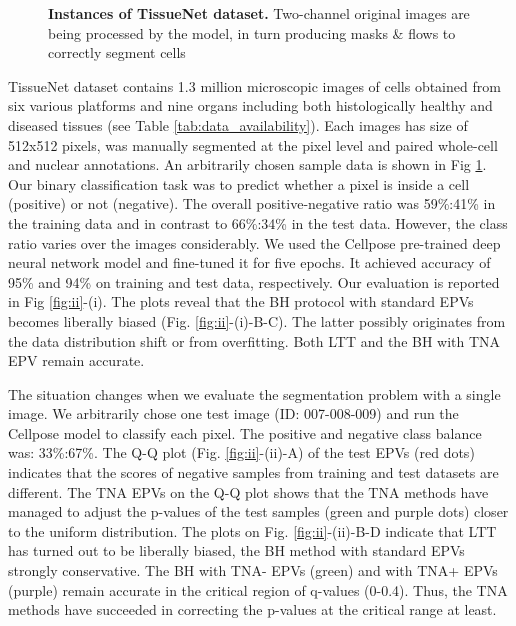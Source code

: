 \documentclass[10pt,letterpaper]{article}
\begin{document}
\begin{figure}[h!]
    \centering
	\caption{{\bf Instances of TissueNet dataset.} Two-channel original images are being processed by the model, in turn producing masks \& flows to correctly segment cells}
	\label{fig:tissue_example}
\end{figure} 

TissueNet dataset contains 1.3 million microscopic images of cells obtained from six various platforms and nine organs including both histologically healthy and diseased tissues \cite{greenwald2022whole}(see Table \ref{tab:data_availability}).
Each images has size of 512x512 pixels, was manually segmented at the pixel level and paired whole-cell and nuclear annotations.
An arbitrarily chosen sample data is shown in Fig \ref{fig:tissue_example}.
Our binary classification task was to predict whether a pixel is inside a cell (positive) or not (negative).
The overall positive-negative ratio was 59\%:41\% in the training data and in contrast to 66\%:34\% in the test data.
However, the class ratio varies over the images considerably.
We used the Cellpose pre-trained deep neural network model \cite{cellpose} and fine-tuned it for five epochs.
It achieved accuracy of 95\% and 94\% on training and test data, respectively.
Our evaluation is reported in Fig \ref{fig:ii}-(i).
The plots reveal that the BH protocol with standard EPVs becomes liberally biased (Fig. \ref{fig:ii}-(i)-B-C).
The latter possibly originates from the data distribution shift or from overfitting.
Both LTT and the BH with TNA EPV remain accurate. 

The situation changes when we evaluate the segmentation problem with a single image.
We arbitrarily chose one test image (ID: 007-008-009) and run the Cellpose model to classify each pixel.
The positive and negative class balance was: 33\%:67\%.
The Q-Q plot (Fig. \ref{fig:ii}-(ii)-A) of the test EPVs (red dots) indicates that the scores of negative samples from training and test datasets are different.
The TNA EPVs on the Q-Q plot shows that the TNA methods have managed to adjust the p-values of the test samples (green and purple dots) closer to the uniform distribution.
The plots on Fig. \ref{fig:ii}-(ii)-B-D indicate that LTT has turned out to be liberally biased, the BH method with standard EPVs strongly conservative.
The BH with TNA- EPVs (green) and with TNA+ EPVs (purple) remain accurate in the critical region of q-values (0-0.4).
Thus, the TNA methods have succeeded in correcting the p-values at the critical range at least. 
\end{document}
